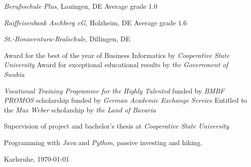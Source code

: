 \documentclass[10pt]{article}
\begin{document}
 \vspace{0.01in} 
\newline \emph{Berufsschule Plus}, Lauingen, DE
\newline\noindent Average grade $1.0$
\medskip

 \vspace{0.01in} 
\newline \noindent \emph{Raiffeisenbank Aschberg eG}, Holzheim, DE
\newline\noindent Average grade $1.6$
\medskip

 \vspace{0.01in} 
\newline \noindent \emph{St.-Bonaventura-Realschule}, Dillingen, DE
\bigskip

\medskip
{}
\noindent Award for the best of the year of Business Informatics by \textit{Cooperative State University} 
\medskip
\newline\noindent Award for exceptional educational results by \textit{the Government of Swabia} 
\bigskip

\medskip
{}
\noindent \textit{Vocational Training Programme for the Highly Talented} funded by \textit{BMBF} 
\medskip
\newline\noindent \textit{PROMOS} scholarship funded by \textit{German Academic Exchange Service} 
\medskip
\newline\noindent Entitled to the \textit{Max Weber} scholarship by \textit{the Land of Bavaria} 
\bigskip

\medskip
{}
\noindent Supervision of project and bachelor's thesis at \textit{Cooperative State University} 
\medskip

\bigskip
{}
\noindent Programming with \textit{Java} and \textit{Python}, passive investing and hiking.
\medskip
\newline\noindent
\bigskip

\bigskip
\noindent Karlsruhe, \today
\medskip
\end{document}
